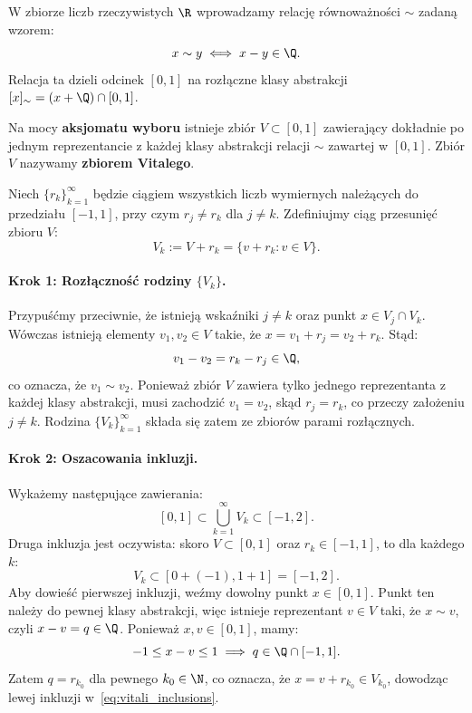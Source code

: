 \begin{dow}
    W zbiorze liczb rzeczywistych $\R$ wprowadzamy relację równoważności $\sim$ zadaną wzorem:
    \begin{equation*}
        x \sim y \iff x - y \in \Q.
    \end{equation*}
    Relacja ta dzieli odcinek $[0, 1]$ na rozłączne klasy abstrakcji $[x]_\sim = (x + \Q) \cap [0, 1]$.

    Na mocy \textbf{aksjomatu wyboru} istnieje zbiór $V \subset [0, 1]$ zawierający dokładnie po jednym reprezentancie z każdej klasy abstrakcji relacji $\sim$ zawartej w $[0, 1]$. Zbiór $V$ nazywamy \textbf{zbiorem Vitalego}.

    Niech $\{r_k\}_{k=1}^\infty$ będzie ciągiem wszystkich liczb wymiernych należących do przedziału $[-1, 1]$, przy czym $r_j \neq r_k$ dla $j \neq k$. Zdefiniujmy ciąg przesunięć zbioru $V$:
    \begin{equation*}
        V_k := V + r_k = \{v + r_k \colon v \in V\}.
    \end{equation*}

    \paragraph{Krok 1: Rozłączność rodziny $\{V_k\}$.}
    Przypuśćmy przeciwnie, że istnieją wskaźniki $j \neq k$ oraz punkt $x \in V_j \cap V_k$. Wówczas istnieją elementy $v_1, v_2 \in V$ takie, że $x = v_1 + r_j = v_2 + r_k$. Stąd:
    \begin{equation*}
        v_1 - v_2 = r_k - r_j \in \Q,
    \end{equation*}
    co oznacza, że $v_1 \sim v_2$. Ponieważ zbiór $V$ zawiera tylko jednego reprezentanta z każdej klasy abstrakcji, musi zachodzić $v_1 = v_2$, skąd $r_j = r_k$, co przeczy założeniu $j \neq k$. Rodzina $\{V_k\}_{k=1}^\infty$ składa się zatem ze zbiorów parami rozłącznych.

    \paragraph{Krok 2: Oszacowania inkluzji.}
    Wykażemy następujące zawierania:
    \begin{equation}\label{eq:vitali_inclusions}
        [0, 1] \subset \bigcup_{k=1}^\infty V_k \subset [-1, 2].
    \end{equation}
    Druga inkluzja jest oczywista: skoro $V \subset [0, 1]$ oraz $r_k \in [-1, 1]$, to dla każdego $k$:
    \begin{equation*}
        V_k \subset [0 + (-1), 1 + 1] = [-1, 2].
    \end{equation*}
    Aby dowieść pierwszej inkluzji, weźmy dowolny punkt $x \in [0, 1]$. Punkt ten należy do pewnej klasy abstrakcji, więc istnieje reprezentant $v \in V$ taki, że $x \sim v$, czyli $x - v = q \in \Q$. Ponieważ $x, v \in [0, 1]$, mamy:
    \begin{equation*}
        -1 \le x - v \le 1 \implies q \in \Q \cap [-1, 1].
    \end{equation*}
    Zatem $q = r_{k_0}$ dla pewnego $k_0 \in \N$, co oznacza, że $x = v + r_{k_0} \in V_{k_0}$, dowodząc lewej inkluzji w~\eqref{eq:vitali_inclusions}.


\end{dow}
